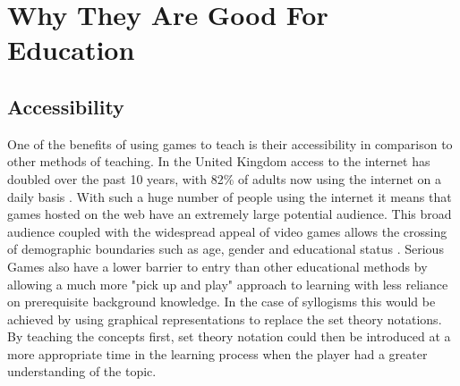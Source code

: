 \documentclass[12pt,a4paper]{report}
\begin{document}
\section{Why They Are Good For Education}
\subsection{Accessibility}
One of the benefits of using games to teach is their accessibility in comparison to other methods of teaching. In the United Kingdom  access to the internet has doubled over the past 10 years, with 82\% of adults now using the internet on a daily basis \citep{onssurvey}. With such a huge number of people using the internet it means that games hosted on the web have an extremely large potential audience. This broad audience coupled with the widespread appeal of video games allows the crossing of demographic boundaries such as age, gender and educational status \citep{griffiths2002educational}.  Serious Games also have a lower barrier to entry than other educational methods by allowing a much more "pick up and play" approach to learning with less reliance on prerequisite background knowledge. In the case of syllogisms this would be achieved by using graphical representations to replace the set theory notations. By teaching the concepts first, set theory notation could then be introduced at a more appropriate time in the learning process when the player had a greater understanding of the topic. 
\end{document}
